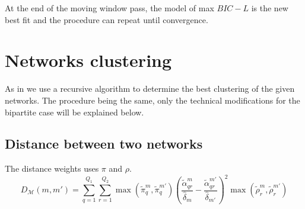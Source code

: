 \documentclass[12pt,a4paper]{report}
\begin{document}
At the end of the moving window pass, the model of max $BIC-L$ is the new best
fit and the procedure can repeat until convergence.

\section{Networks clustering}
As in \cite{chabert-liddellLearningCommonStructures2023} we use a recursive
algorithm to determine the best clustering of the given networks. The procedure
being the same, only the technical modifications for the bipartite case will be
explained below.
\subsection{Distance between two networks}
The distance weights uses $\pi$ and $\rho$.
\[ 
    D_{\mathcal{M}}(m,m') = \sum_{q = 1}^{Q_1} \sum_{r = 1}^{Q_2} \max(\widetilde{\pi}_{q}^{m}, \widetilde{\pi}_{q}^{m'}) \left( \frac{\widetilde{\alpha}_{qr}^{m}}{\widehat{\delta}_{m}} - \frac{\widetilde{\alpha}_{qr}^{m'}}{\widehat{\delta}_{m'}}\right)^{2} \max(\widetilde{\rho}_{r}^{m}, \widetilde{\rho}_{r}^{m'}) 
\]


\nocite{*}


\listoffigures
\listoftables
\end{document}
